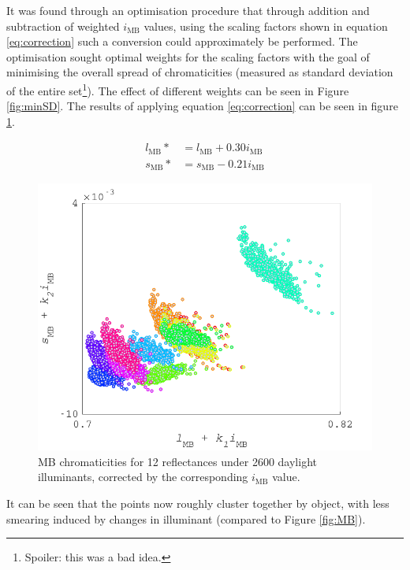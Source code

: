 It was found through an optimisation procedure that through addition and subtraction of weighted $i_{\text{MB}}$ values, using the scaling factors shown in equation \ref{eq:correction} such a conversion could approximately be performed. The optimisation sought optimal weights for the scaling factors with the goal of minimising the overall spread of chromaticities (measured as standard deviation of the entire set\footnote{Spoiler: this was a bad idea.}). The effect of different weights can be seen in Figure \ref{fig:minSD}. The results of applying equation \ref{eq:correction} can be seen in figure \ref{fig:corrected}.

\begin{subequations} \label{eq:correction}
\begin{align}
l_{\text{MB}}* &= l_{\text{MB}} + 0.30i_{\text{MB}}\\ %
s_{\text{MB}}* &= s_{\text{MB}} - 0.21i_{\text{MB}}
\end{align}
\end{subequations}

\begin{figure}[htbp]
    \includegraphics[max width=\textwidth]{figs/comp/melcomp_1/correctedChromaticities.pdf}
    \caption{\gls{MB} chromaticities for 12 reflectances under 2600 daylight illuminants, corrected by the corresponding $i_{\text{MB}}$ value.}
    \label{fig:corrected}
\end{figure} 

It can be seen that the points now roughly cluster together by object, with less smearing induced by changes in illuminant (compared to Figure \ref{fig:MB}).

